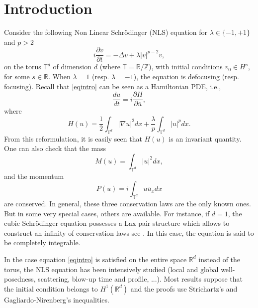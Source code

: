 \documentclass[11pt,leqno]{amsart}
\newcommand{\R}{\mathbb{R}}
\newcommand{\Z}{\mathbb{Z}}
\newcommand{\T}{\mathbb{T}}
\begin{document}
\section{Introduction}
 Consider the following Non Linear Schr\"odinger (NLS) equation for $\lambda \in \{ -1, +1\}$ and $p>2$
\begin{equation}
\label{eqintro}
i\frac{\partial v}{\partial t}= -\Delta v +  \lambda |v|^{p-2} v,
\end{equation}
 on the torus $\T^d$ of dimension $d$ (where $\T={\R}/{\Z}$), with initial conditions $v_0\in H^s$, for some $s\in \R$. When $\lambda =1$ (resp. $\lambda =-1$), the equation is defocusing
 (resp. focusing). Recall that \eqref{eqintro} can be seen as a Hamiltonian PDE, i.e.,
$$\dfrac{d u}{dt}= i \dfrac{\partial H}{\partial \overline{u}},$$
where 
$$H(u)= \dfrac{1}{2} \int_{\T^d} |\nabla u|^2 dx+  \dfrac{\lambda}{p} \int_{\T^d} |u|^{p} dx.$$
From this reformulation, it is easily seen that $H(u)$ is an invariant quantity. One can also check that the mass 
$$M(u)= \int_{\T^d} |u|^2 dx,$$
and the momentum
$$P(u)=i\int_{\T^d} u \overline{u}_x dx$$
 are conserved. In general, these three conservation laws are the only known ones.  But in some very special cases, others are available. 
For instance, if $d=1$, the cubic Schr\" odinger equation possesses a Lax pair structure which allows to construct an infinity of conservation laws see \cite{MR905674}. %
In this case, the equation is said to be completely integrable. 

In the case equation \eqref{eqintro} is satisfied on the entire space ${\mathbb R}^d$ instead of the torus, the NLS equation  has been intensively
studied (local and global well-posedness, scattering, blow-up time and profile, ...). Most results suppose that the initial condition belongs to $H^1({\mathbb R}^d)$ and the proofs use 
 Strichartz's and Gagliardo-Nirenberg's inequalities. 
\bigskip
\end{document}
